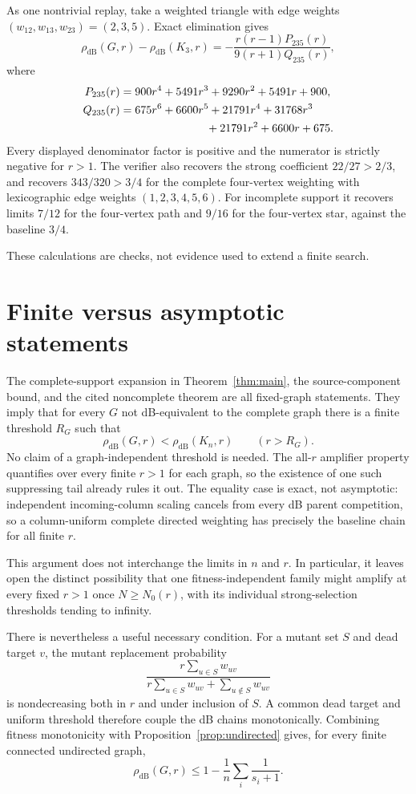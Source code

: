 \documentclass[11pt]{article}
\newcommand{\dB}{\mathrm{dB}}
\begin{document}
As one nontrivial replay, take a weighted triangle with edge weights
$(w_{12},w_{13},w_{23})=(2,3,5)$.  Exact elimination gives
\[
 \rho_{\dB}(G,r)-\rho_{\dB}(K_3,r)
 =-\frac{r(r-1)P_{235}(r)}{9(r+1)Q_{235}(r)},
\]
where
\[
 \begin{aligned}
 P_{235}(r)&=900r^4+5491r^3+9290r^2+5491r+900,\\
 Q_{235}(r)&=675r^6+6600r^5+21791r^4+31768r^3\\
     &\hspace{2.7cm}{}+21791r^2+6600r+675.
 \end{aligned}
\]
Every displayed denominator factor is positive and the numerator is strictly
negative for $r>1$.  The verifier also recovers the strong coefficient
$22/27>2/3$, and recovers $343/320>3/4$ for the complete four-vertex weighting
with lexicographic edge weights $(1,2,3,4,5,6)$.  For incomplete support it
recovers limits $7/12$ for the four-vertex path and $9/16$ for the four-vertex
star, against the baseline $3/4$.

These calculations are checks, not evidence used to extend a finite search.

\section{Finite versus asymptotic statements}

The complete-support expansion in Theorem~\ref{thm:main}, the source-component
bound, and the cited noncomplete theorem are all fixed-graph statements.  They
imply that for every $G$ not dB-equivalent to the complete graph there is a
finite threshold $R_G$ such that
\[
 \rho_{\dB}(G,r)<\rho_{\dB}(K_n,r)\qquad(r>R_G).
\]
No claim of a graph-independent threshold is needed.  The all-$r$ amplifier
property quantifies over every finite $r>1$ for each graph, so the existence of
one such suppressing tail already rules it out.  The equality case is exact,
not asymptotic: independent incoming-column scaling cancels from every dB
parent competition, so a column-uniform complete directed weighting has
precisely the baseline chain for all finite $r$.

This argument does not interchange the limits in $n$ and $r$.  In particular,
it leaves open the distinct possibility that one fitness-independent family
might amplify at every fixed $r>1$ once $N\ge N_0(r)$, with its individual
strong-selection thresholds tending to infinity.

There is nevertheless a useful necessary condition.  For a mutant set $S$
and dead target $v$, the mutant replacement probability
\[
 \frac{r\sum_{u\in S}w_{uv}}
 {r\sum_{u\in S}w_{uv}+\sum_{u\notin S}w_{uv}}
\]
is nondecreasing both in $r$ and under inclusion of $S$.  A common dead target
and uniform threshold therefore couple the dB chains monotonically.  Combining
fitness monotonicity with Proposition~\ref{prop:undirected} gives, for every
finite connected undirected graph,
\begin{equation}\label{eq:support-upper-bound}
 \rho_{\dB}(G,r)\le 1-\frac1n\sum_i\frac1{s_i+1}.
\end{equation}
\end{document}
